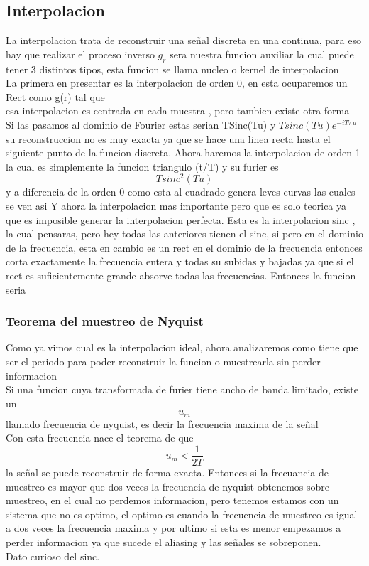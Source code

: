 \subsection{Interpolacion}
La interpolacion trata de reconstruir una señal discreta en una continua, para eso hay que realizar el proceso inverso 
$g_r$ sera nuestra funcion auxiliar la cual puede tener 3 distintos tipos, esta funcion se llama nucleo o kernel de interpolacion\\
La primera en presentar es la interpolacion de orden 0, en esta ocuparemos un Rect como g(r) tal que 
\\
esa interpolacion es centrada en cada muestra , pero tambien existe otra forma
\\
Si las pasamos al dominio de Fourier estas serian TSinc(Tu) y $Tsinc(Tu)e^{-iT\pi u}$ su reconstruccion no es muy exacta ya que se hace una linea recta hasta el siguiente punto de la funcion discreta.
Ahora haremos la interpolacion de orden 1 la cual es simplemente la funcion triangulo (t/T) y su furier es $$Tsinc^2(Tu)$$ y a diferencia de la orden 0 como esta al cuadrado genera leves curvas las cuales se ven asi
Y ahora la interpolacion mas importante pero que es solo teorica ya que es imposible generar la interpolacion perfecta. Esta es la interpolacion sinc , la cual pensaras, pero hey todas las anteriores tienen el sinc, si pero en el dominio de la frecuencia, esta en cambio es un rect en el dominio de la frecuencia entonces corta exactamente la frecuencia entera y todas su subidas y bajadas ya que si el rect es suficientemente grande absorve todas las frecuencias.
Entonces la funcion seria
\subsubsection{Teorema del muestreo de Nyquist}
Como ya vimos cual es la interpolacion ideal, ahora analizaremos como tiene que ser el periodo para poder reconstruir la funcion o muestrearla sin perder informacion\\
Si una funcion cuya transformada de furier tiene ancho de banda limitado, existe un $$u_m$$ llamado frecuencia de nyquist, es decir la frecuencia maxima de la señal\\
Con esta frecuencia nace el teorema de que $$u_m<\frac{1}{2T}$$ la señal se puede reconstruir de forma exacta.
Entonces si la frecuancia de muestreo es mayor que dos veces la frecuencia de nyquist obtenemos sobre muestreo, en el cual no perdemos informacion, pero tenemos estamos con un sistema que no es optimo, el optimo es cuando la frecuencia de muestreo es igual a dos veces la frecuencia maxima y por ultimo si esta es menor empezamos a perder informacion ya que sucede el aliasing y las señales se sobreponen. 
\\
 Dato curioso del sinc.
